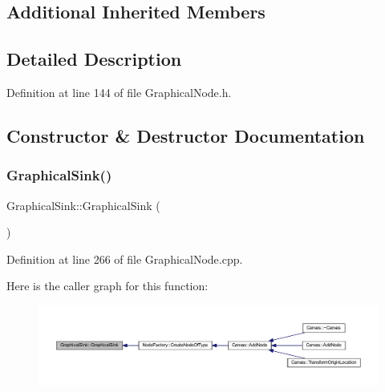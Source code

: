 \subsection*{Additional Inherited Members}


\subsection{Detailed Description}


Definition at line 144 of file Graphical\+Node.\+h.



\subsection{Constructor \& Destructor Documentation}
\mbox{\label{class_graphical_sink_ab59d3cff17a43fac7fc1f364681cd35f}} 
\subsubsection{\texorpdfstring{Graphical\+Sink()}{GraphicalSink()}\hspace{0.1cm}{\footnotesize\ttfamily [1/2]}}
{\footnotesize\ttfamily Graphical\+Sink\+::\+Graphical\+Sink (\begin{DoxyParamCaption}{ }\end{DoxyParamCaption})}



Definition at line 266 of file Graphical\+Node.\+cpp.

Here is the caller graph for this function\+:
\nopagebreak
\begin{figure}[H]
\begin{center}
\leavevmode
\includegraphics[width=350pt]{class_graphical_sink_ab59d3cff17a43fac7fc1f364681cd35f_icgraph}
\end{center}
\end{figure}
\mbox{\label{class_graphical_sink_a2a70f127f23e0e4279b90c565859c7cb}} 
